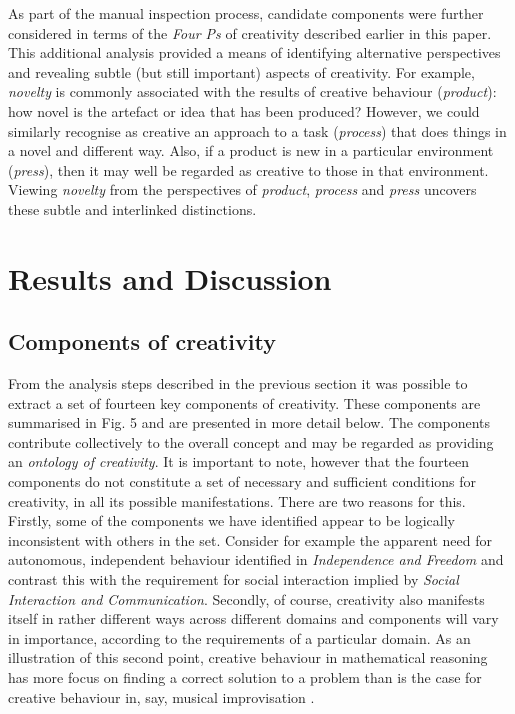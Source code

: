\documentclass[10pt,letterpaper]{article}
\begin{document}
As part of the manual inspection process, candidate components were further considered in terms of the {\em Four Ps} of creativity \cite{rhodes61,mooney63,mackinnon70,kaufman09} described earlier in this paper. This additional analysis provided a means of identifying alternative perspectives and revealing subtle (but still important) aspects of creativity.  For example, {\em novelty} is commonly associated with the results of creative behaviour ({\em product\/}): how novel is the artefact or idea that has been produced? However, we could similarly recognise as creative an approach to a task  ({\em process\/}) that does things in a novel and different way.  Also, if a product is new in a particular environment ({\em press\/}), then it may well be regarded as creative to those in that environment. Viewing {\em novelty} from the perspectives of {\em product}, {\em process} and {\em press} uncovers these subtle and interlinked distinctions.

\section*{Results and Discussion}
\label{results}

\subsection*{Components of creativity}\label{componentsResults}


From the analysis steps described in the previous section it was possible to extract a set of fourteen key components of creativity. These components are summarised in Fig. 5 %
and are presented in more detail below. The components contribute collectively to the overall concept and may be regarded as providing an {\em ontology of creativity\/}.  It is important to note, however that the fourteen components do not constitute a set of necessary and sufficient conditions for creativity, in all its possible manifestations. There are two reasons for this. Firstly, some of the components we have identified appear to be logically inconsistent with others in the set. Consider for example the apparent need for autonomous, independent behaviour identified in {\em Independence and Freedom\/} and contrast this with the requirement for social interaction implied by {\em Social Interaction and Communication\/}. %
Secondly, of course, creativity %
also manifests itself in rather different ways across different domains \cite{plucker04} and components will vary in importance, according to the requirements of a particular domain. As an illustration of this second point, %
creative behaviour in mathematical reasoning has more focus on finding a correct solution to a problem than is the case for creative behaviour in, say,  musical improvisation \cite{colton08,jordanous12jims}. 
\end{document}
